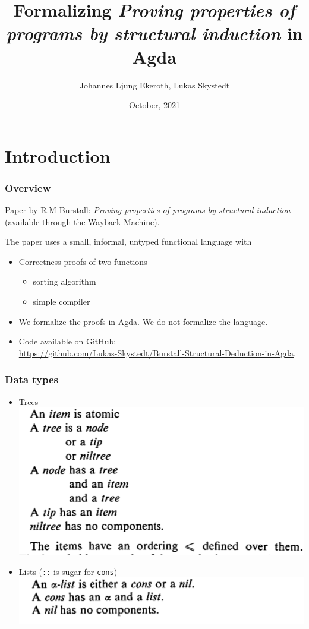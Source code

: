 \documentclass{beamer}
\title{Formalizing \textit{Proving properties of programs by structural induction} in Agda}
\author{Johannes Ljung Ekeroth, Lukas Skystedt}
\date{October, 2021}
\newcommand{\code}[1]{\texttt{#1}}
\begin{document}
\beamertemplatenavigationsymbolsempty %
\section{Introduction}
\frame{\titlepage}
\begin{frame}[fragile]
  \frametitle{Overview}
  Paper by R.M Burstall: \textit{Proving properties of programs by structural induction} (available through the \href{https://web.archive.org/web/20201112001546/https://www.cse.chalmers.se/edu/year/2010/course/DAT140_Types/Burstall.pdf}{Wayback Machine}).
\vspace{1em}

  The paper uses a small, informal, untyped functional language with
  \begin{itemize}
  \item Correctness proofs of two functions
    \begin{itemize}
    \item sorting algorithm
    \item simple compiler
    \end{itemize} 
    \pause
  \item We formalize the proofs in Agda. We do not formalize the language.
    \pause
  \item Code available on GitHub:\\ \small \url{https://github.com/Lukas-Skystedt/Burstall-Structural-Deduction-in-Agda}.
  \end{itemize}
\end{frame}

\begin{frame}
  \frametitle{Data types}
  \begin{itemize}
  \item Trees\\
    \includegraphics[width=.6\textwidth]{./tree.png}
  \item Lists (\code{::} is sugar for \code{cons})\\
    \includegraphics[width=.6\textwidth]{./list.png}
  \end{itemize}
\end{frame} 
\end{document}
